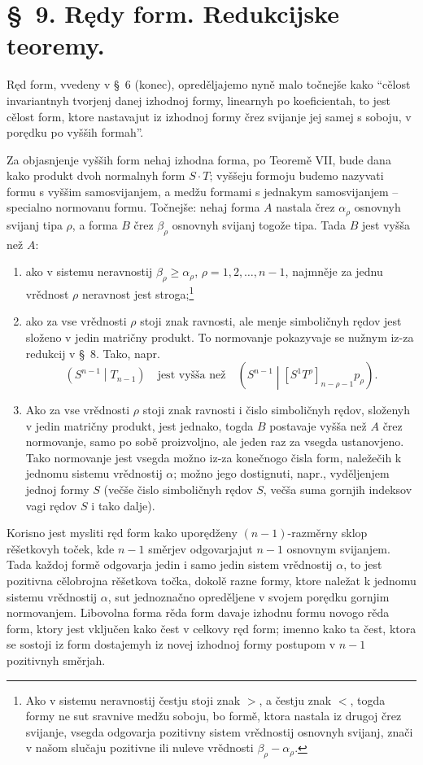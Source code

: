 \documentclass[11pt]{article}
\newcommand{\pair}[2]{\left(#1\middle|#2\right)}
\begin{document}
\section*{\S\ 9. Rędy form. Redukcijske teoremy.}

Ręd form, vvedeny v \S\ 6 (konec), opreděljajemo nyně malo točnejše kako ``cělost invariantnyh tvorjenj danej izhodnoj formy, linearnyh po koeficientah, to jest cělost form, ktore nastavajut iz izhodnoj formy črez svijanje jej samej s soboju, v porędku po vyšših formah''.

Za objasnjenje vyšših form nehaj izhodna forma, po Teoremě VII, bude dana kako produkt dvoh normalnyh form $S\cdot T$; vyššeju formoju budemo nazyvati formu s vyššim samosvijanjem, a medžu formami s jednakym samosvijanjem -- specialno normovanu formu. Točnejše: nehaj forma $A$ nastala črez $\alpha_\rho$ osnovnyh svijanj tipa $\rho$, a forma $B$ črez $\beta_\rho$ osnovnyh svijanj togože tipa. Tada $B$ jest vyšša než $A$:
\begin{enumerate}
\item ako v sistemu neravnostij $\beta_\rho\ge\alpha_\rho$, $\rho=1,2,\ldots,n-1$, najmněje za jednu vrědnost $\rho$ neravnost jest stroga;\footnote{Ako v sistemu neravnostij čestju stoji znak $>$, a čestju znak $<$, togda formy ne sut sravnive medžu soboju, bo formě, ktora nastala iz drugoj črez svijanje, vsegda odgovarja pozitivny sistem vrědnostij osnovnyh svijanj, znači v našom slučaju pozitivne ili nuleve vrědnosti $\beta_\rho-\alpha_\rho$.}
\item ako za vse vrědnosti $\rho$ stoji znak ravnosti, ale menje simboličnyh rędov jest složeno v jedin matričny produkt. To normovanje pokazyvaje se nužnym iz-za redukcij v \S\ 8. Tako, napr.
\[
\pair{S^{n-1}}{T_{n-1}}
\quad\text{jest vyšša než}\quad
\pair{S^{n-1}}{[S^1T^\rho]_{n-\rho-1}p_\rho}.
\]
\item Ako za vse vrědnosti $\rho$ stoji znak ravnosti i čislo simboličnyh rędov, složenyh v jedin matričny produkt, jest jednako, togda $B$ postavaje vyšša než $A$ črez normovanje, samo po sobě proizvoljno, ale jeden raz za vsegda ustanovjeno. Tako normovanje jest vsegda možno iz-za konečnogo čisla form, naležečih k jednomu sistemu vrědnostij $\alpha$; možno jego dostignuti, napr., vyděljenjem jednoj formy $S$ (večše čislo simboličnyh rędov $S$, večša suma gornjih indeksov vagi rędov $S$ i tako dalje).
\end{enumerate}
Korisno jest mysliti ręd form kako uporędženy $(n-1)$-razměrny sklop rěšetkovyh toček, kde $n-1$ směrjev odgovarjajut $n-1$ osnovnym svijanjem. Tada každoj formě odgovarja jedin i samo jedin sistem vrědnostij $\alpha$, to jest pozitivna cělobrojna rěšetkova točka, dokolě razne formy, ktore naležat k jednomu sistemu vrědnostij $\alpha$, sut jednoznačno opreděljene v svojem porędku gornjim normovanjem. Libovolna forma rěda form davaje izhodnu formu novogo rěda form, ktory jest vključen kako čest v celkovy ręd form; imenno kako ta čest, ktora se sostoji iz form dostajemyh iz novej izhodnoj formy postupom v $n-1$ pozitivnyh směrjah.
\end{document}
